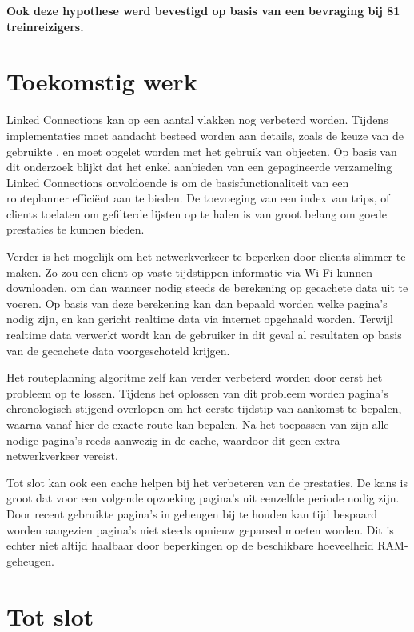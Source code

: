 \textbf{Ook deze hypothese werd bevestigd op basis van een bevraging bij 81 treinreizigers.}
	
\section{Toekomstig werk}
\label{sec:futurework}
Linked Connections kan op een aantal vlakken nog verbeterd worden. Tijdens implementaties moet aandacht besteed worden aan details, zoals de keuze van de gebruikte , en moet opgelet worden met het gebruik van  objecten. Op basis van dit onderzoek blijkt dat het enkel aanbieden van een gepagineerde verzameling Linked Connections onvoldoende is om de basisfunctionaliteit van een routeplanner efficiënt aan te bieden. De toevoeging van een index van trips, of clients toelaten om gefilterde lijsten op te halen is van groot belang om goede prestaties te kunnen bieden.

Verder is het mogelijk om het netwerkverkeer te beperken door clients slimmer te maken. Zo zou een client op vaste tijdstippen informatie via Wi-Fi kunnen downloaden, om dan wanneer nodig steeds de berekening op gecachete data uit te voeren. Op basis van deze berekening kan dan bepaald worden welke pagina's nodig zijn, en kan gericht realtime data via internet opgehaald worden. Terwijl realtime data verwerkt wordt kan de gebruiker in dit geval al resultaten op basis van de gecachete data voorgeschoteld krijgen.

Het routeplanning algoritme zelf kan verder verbeterd worden door eerst het  probleem op te lossen. Tijdens het oplossen van dit probleem worden pagina's chronologisch stijgend overlopen om het eerste tijdstip van aankomst te bepalen, waarna  vanaf hier de exacte route kan bepalen. Na het toepassen van  zijn alle nodige pagina's reeds aanwezig in de cache, waardoor dit geen extra netwerkverkeer vereist.

Tot slot kan ook een  cache helpen bij het verbeteren van de prestaties. De kans is groot dat voor een volgende opzoeking pagina's uit eenzelfde periode nodig zijn. Door recent gebruikte pagina's in geheugen bij te houden kan tijd bespaard worden aangezien pagina's niet steeds opnieuw geparsed moeten worden. Dit is echter niet altijd haalbaar door beperkingen op de beschikbare hoeveelheid RAM-geheugen.

\section{Tot slot}
	
